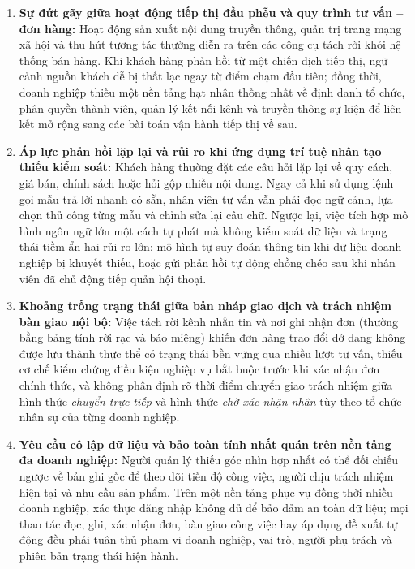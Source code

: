 \begin{enumerate}
  \item \textbf{Sự đứt gãy giữa hoạt động tiếp thị đầu phễu và quy trình tư vấn -- đơn hàng:} Hoạt động sản xuất nội dung truyền thông, quản trị trang mạng xã hội và thu hút tương tác thường diễn ra trên các công cụ tách rời khỏi hệ thống bán hàng. Khi khách hàng phản hồi từ một chiến dịch tiếp thị, ngữ cảnh nguồn khách dễ bị thất lạc ngay từ điểm chạm đầu tiên; đồng thời, doanh nghiệp thiếu một nền tảng hạt nhân thống nhất về định danh tổ chức, phân quyền thành viên, quản lý kết nối kênh và truyền thông sự kiện để liên kết mở rộng sang các bài toán vận hành tiếp thị về sau.
  \item \textbf{Áp lực phản hồi lặp lại và rủi ro khi ứng dụng trí tuệ nhân tạo thiếu kiểm soát:} Khách hàng thường đặt các câu hỏi lặp lại về quy cách, giá bán, chính sách hoặc hỏi gộp nhiều nội dung. Ngay cả khi sử dụng lệnh gọi mẫu trả lời nhanh có sẵn, nhân viên tư vấn vẫn phải đọc ngữ cảnh, lựa chọn thủ công từng mẫu và chỉnh sửa lại câu chữ. Ngược lại, việc tích hợp mô hình ngôn ngữ lớn một cách tự phát mà không kiểm soát dữ liệu và trạng thái tiềm ẩn hai rủi ro lớn: mô hình tự suy đoán thông tin khi dữ liệu doanh nghiệp bị khuyết thiếu, hoặc gửi phản hồi tự động chồng chéo sau khi nhân viên đã chủ động tiếp quản hội thoại.
  \item \textbf{Khoảng trống trạng thái giữa bản nháp giao dịch và trách nhiệm bàn giao nội bộ:} Việc tách rời kênh nhắn tin và nơi ghi nhận đơn (thường bằng bảng tính rời rạc và báo miệng) khiến đơn hàng trao đổi dở dang không được lưu thành thực thể có trạng thái bền vững qua nhiều lượt tư vấn, thiếu cơ chế kiểm chứng điều kiện nghiệp vụ bắt buộc trước khi xác nhận đơn chính thức, và không phân định rõ thời điểm chuyển giao trách nhiệm giữa hình thức \emph{chuyển trực tiếp} và hình thức \emph{chờ xác nhận nhận} tùy theo tổ chức nhân sự của từng doanh nghiệp.
  \item \textbf{Yêu cầu cô lập dữ liệu và bảo toàn tính nhất quán trên nền tảng đa doanh nghiệp:} Người quản lý thiếu góc nhìn hợp nhất có thể đối chiếu ngược về bản ghi gốc để theo dõi tiến độ công việc, người chịu trách nhiệm hiện tại và nhu cầu sản phẩm. Trên một nền tảng phục vụ đồng thời nhiều doanh nghiệp, xác thực đăng nhập không đủ để bảo đảm an toàn dữ liệu; mọi thao tác đọc, ghi, xác nhận đơn, bàn giao công việc hay áp dụng đề xuất tự động đều phải tuân thủ phạm vi doanh nghiệp, vai trò, người phụ trách và phiên bản trạng thái hiện hành.
\end{enumerate}

